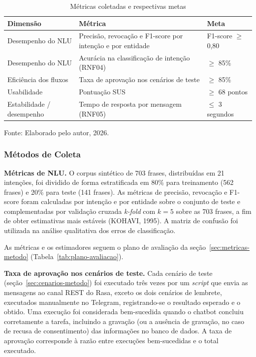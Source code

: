 \documentclass[12pt,a4paper]{extarticle}
\begin{document}
\begin{table}[H]
\centering
\caption{Métricas coletadas e respectivas metas}
\label{tab:metricas}
\begin{tabular}{p{3.6cm}p{5.4cm}p{3.6cm}}
\hline
\textbf{Dimensão} & \textbf{Métrica} & \textbf{Meta} \\
\hline
Desempenho do NLU & Precisão, revocação e F1-score por intenção e por entidade & F1-score $\geq$ 0,80 \\
Desempenho do NLU & Acurácia na classificação de intenção (RNF04) & $\geq$ 85\% \\
Eficiência dos fluxos & Taxa de aprovação nos cenários de teste & $\geq$ 85\% \\
Usabilidade & Pontuação SUS & $\geq$ 68 pontos \\
Estabilidade / desempenho & Tempo de resposta por mensagem (RNF05) & $\leq$ 3 segundos \\
\hline
\end{tabular}
\vspace{0.3cm}

\footnotesize{Fonte: Elaborado pelo autor, 2026.}
\end{table}

\subsubsection{Métodos de Coleta}
\label{sec:metodos_coleta}

\textbf{Métricas de NLU.} O corpus sintético de 703 frases, distribuídas em 21 intenções, foi dividido de forma estratificada em 80\% para treinamento (562 frases) e 20\% para teste (141 frases). As métricas de precisão, revocação e F1-score foram calculadas por intenção e por entidade sobre o conjunto de teste e complementadas por validação cruzada \textit{k-fold} com $k=5$ sobre as 703 frases, a fim de obter estimativas mais estáveis (KOHAVI, 1995). A matriz de confusão foi utilizada na análise qualitativa dos erros de classificação.

As métricas e os estimadores seguem o plano de avaliação da seção~\ref{sec:metricas-metodo} (Tabela~\ref{tab:plano-avaliacao}).

\textbf{Taxa de aprovação nos cenários de teste.} Cada cenário de teste (seção~\ref{sec:cenarios-metodo}) foi executado três vezes por um \textit{script} que envia as mensagens ao canal REST do Rasa, exceto os dois cenários de lembrete, executados manualmente no Telegram, registrando-se o resultado esperado e o obtido. Uma execução foi considerada bem-sucedida quando o chatbot concluiu corretamente a tarefa, incluindo a gravação (ou a ausência de gravação, no caso de recusa de consentimento) das informações no banco de dados. A taxa de aprovação corresponde à razão entre execuções bem-sucedidas e o total executado.
\end{document}
